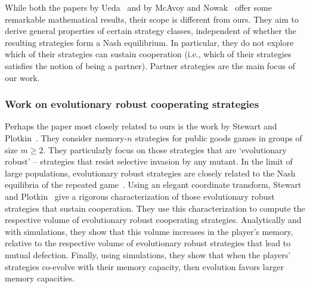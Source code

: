 \documentclass[9pt,twoside,lineno]{pnas-new}
\theoremstyle{plainCl1}
\theoremstyle{plainCl2}
\begin{document}
While both the papers by Ueda~\cite{ueda:RSOP:2021, Ueda:ORF:2022} and by McAvoy and Nowak~\cite{mcavoy:PRSA:2019} offer some remarkable mathematical results, their scope is different from ours.
They aim to derive general properties of certain strategy classes, independent of whether the resulting strategies form a Nash equilibrium. 
In particular, they do not explore which of their strategies can sustain cooperation (i.e., which of their strategies satisfies the notion of being a partner). Partner strategies are the main focus of our work. 

\subsubsection*{Work on evolutionary robust cooperating strategies}
Perhaps the paper most closely related to ours is the work by Stewart and Plotkin~\cite{stewart:scientific:2016}. 
They consider memory-$n$ strategies for public goods games in groups of size $m\!\ge\!2$. 
They  particularly focus on those strategies that are `evolutionary robust' -- strategies that resist selective invasion by any mutant. 
In the limit of large populations, evolutionary robust strategies are closely related to the Nash equilibria of the repeated game~\cite{stewart:pnas:2014}. 
Using an elegant coordinate transform, Stewart and Plotkin~\cite{stewart:scientific:2016} give a rigorous characterization of those evolutionary robust strategies that sustain cooperation.
They use this characterization to compute the respective volume of evolutionary robust cooperating strategies.
Analytically and with simulations, they show that this volume increases in the player's memory, relative to the respective volume of evolutionary robust strategies that lead to mutual defection. 
Finally, using simulations, they show that when the players' strategies co-evolve with their memory capacity, then evolution favors larger memory capacities. 
\end{document}
